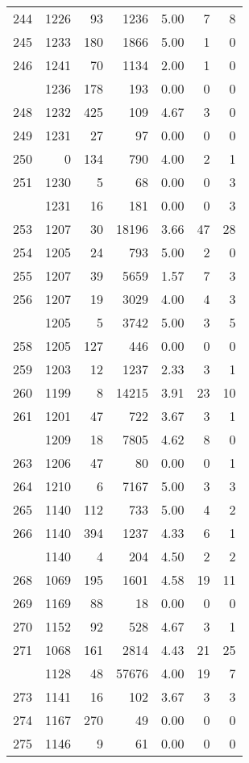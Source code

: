 \documentclass[
]{article}
\begin{document}
\begin{table}
\begin{tabular}[t]{lrrrrrr}
244 & 1226 & 93 & 1236 & 5.00 & 7 & 8\\
245 & 1233 & 180 & 1866 & 5.00 & 1 & 0\\
246 & 1241 & 70 & 1134 & 2.00 & 1 & 0\\
\addlinespace
247 & 1236 & 178 & 193 & 0.00 & 0 & 0\\
248 & 1232 & 425 & 109 & 4.67 & 3 & 0\\
249 & 1231 & 27 & 97 & 0.00 & 0 & 0\\
250 & 0 & 134 & 790 & 4.00 & 2 & 1\\
251 & 1230 & 5 & 68 & 0.00 & 0 & 3\\
\addlinespace
252 & 1231 & 16 & 181 & 0.00 & 0 & 3\\
253 & 1207 & 30 & 18196 & 3.66 & 47 & 28\\
254 & 1205 & 24 & 793 & 5.00 & 2 & 0\\
255 & 1207 & 39 & 5659 & 1.57 & 7 & 3\\
256 & 1207 & 19 & 3029 & 4.00 & 4 & 3\\
\addlinespace
257 & 1205 & 5 & 3742 & 5.00 & 3 & 5\\
258 & 1205 & 127 & 446 & 0.00 & 0 & 0\\
259 & 1203 & 12 & 1237 & 2.33 & 3 & 1\\
260 & 1199 & 8 & 14215 & 3.91 & 23 & 10\\
261 & 1201 & 47 & 722 & 3.67 & 3 & 1\\
\addlinespace
262 & 1209 & 18 & 7805 & 4.62 & 8 & 0\\
263 & 1206 & 47 & 80 & 0.00 & 0 & 1\\
264 & 1210 & 6 & 7167 & 5.00 & 3 & 3\\
265 & 1140 & 112 & 733 & 5.00 & 4 & 2\\
266 & 1140 & 394 & 1237 & 4.33 & 6 & 1\\
\addlinespace
267 & 1140 & 4 & 204 & 4.50 & 2 & 2\\
268 & 1069 & 195 & 1601 & 4.58 & 19 & 11\\
269 & 1169 & 88 & 18 & 0.00 & 0 & 0\\
270 & 1152 & 92 & 528 & 4.67 & 3 & 1\\
271 & 1068 & 161 & 2814 & 4.43 & 21 & 25\\
\addlinespace
272 & 1128 & 48 & 57676 & 4.00 & 19 & 7\\
273 & 1141 & 16 & 102 & 3.67 & 3 & 3\\
274 & 1167 & 270 & 49 & 0.00 & 0 & 0\\
275 & 1146 & 9 & 61 & 0.00 & 0 & 0\\

\end{tabular}
\end{table}
\end{document}

